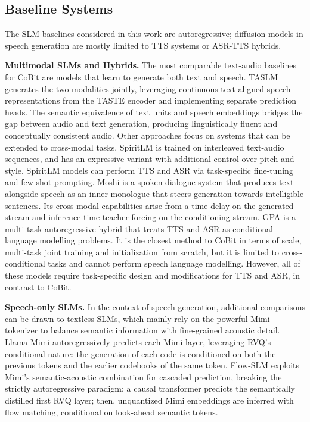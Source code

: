 \subsection{Baseline Systems} \label{app:audio:baselines}

The SLM baselines considered in this work are autoregressive; diffusion models in speech generation are mostly limited to TTS systems or ASR-TTS hybrids. 

\textbf{Multimodal SLMs and Hybrids.} The most comparable text-audio baselines for CoBit are models that learn to generate both text and speech. TASLM \citep{audio:taste} generates the two modalities jointly, leveraging continuous text-aligned speech representations from the TASTE encoder and implementing separate prediction heads. The semantic equivalence of text units and speech embeddings bridges the gap between audio and text generation, producing linguistically fluent and conceptually consistent audio. Other approaches focus on systems that can be extended to cross-modal tasks. SpiritLM \citep{audio:spirit-lm} is trained on interleaved text-audio sequences, and has an expressive variant with additional control over pitch and style. SpiritLM models can perform TTS and ASR via task-specific fine-tuning and few-shot prompting. Moshi \citep{audio:moshi} is a spoken dialogue system that produces text alongside speech as an inner monologue that steers generation towards intelligible sentences. Its cross-modal capabilities arise from a time delay on the generated stream and inference-time teacher-forcing on the conditioning stream. GPA \citep{audio:gpa} is a multi-task autoregressive hybrid that treats TTS and ASR as conditional language modelling problems. It is the closest method to CoBit in terms of scale, multi-task joint training and initialization from scratch, but it is limited to cross-conditional tasks and cannot perform speech language modelling. However, all of these models require task-specific design and modifications for TTS and ASR, in contrast to CoBit.

\textbf{Speech-only SLMs.} In the context of speech generation, additional comparisons can be drawn to textless SLMs, which mainly rely on the powerful Mimi tokenizer to balance semantic information with fine-grained acoustic detail. Llama-Mimi \citep{audio:llama-mimi} autoregressively predicts each Mimi layer, leveraging RVQ's conditional nature: the generation of each code is conditioned on both the previous tokens and the earlier codebooks of the same token. Flow-SLM \citep{audio:flow-slm} exploits Mimi's semantic-acoustic combination for cascaded prediction, breaking the strictly autoregressive paradigm: a causal transformer predicts the semantically distilled first RVQ layer; then, unquantized Mimi embeddings are inferred with flow matching, conditional on look-ahead semantic tokens.

